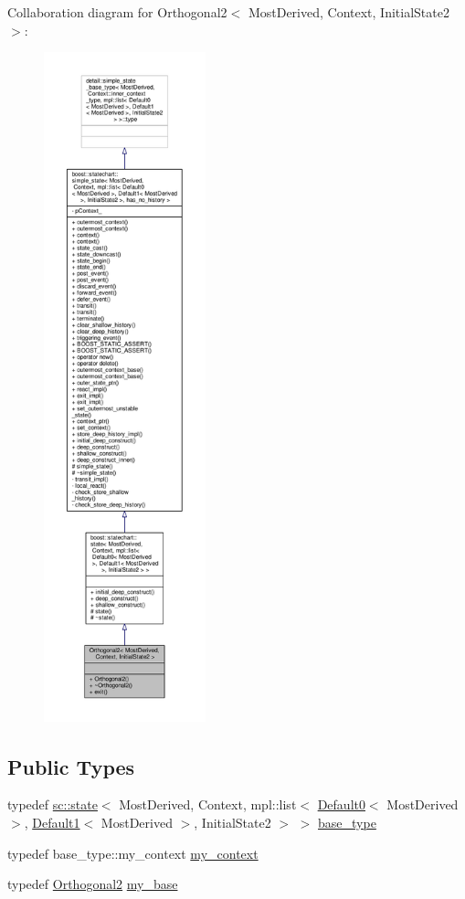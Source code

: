 Collaboration diagram for Orthogonal2$<$ Most\+Derived, Context, Initial\+State2 $>$\+:
\nopagebreak
\begin{figure}[H]
\begin{center}
\leavevmode
\includegraphics[height=550pt]{struct_orthogonal2__coll__graph}
\end{center}
\end{figure}
\subsection*{Public Types}
\begin{DoxyCompactItemize}
\item 
typedef \mbox{\hyperlink{classboost_1_1statechart_1_1state}{sc\+::state}}$<$ Most\+Derived, Context, mpl\+::list$<$ \mbox{\hyperlink{struct_default0}{Default0}}$<$ Most\+Derived $>$, \mbox{\hyperlink{struct_default1}{Default1}}$<$ Most\+Derived $>$, Initial\+State2 $>$ $>$ \mbox{\hyperlink{struct_orthogonal2_ae34a8b5ceae188cb0020b4f396f9fee0}{base\+\_\+type}}
\item 
typedef base\+\_\+type\+::my\+\_\+context \mbox{\hyperlink{struct_orthogonal2_a7ba3bc806df60eb29290185043ac202e}{my\+\_\+context}}
\item 
typedef \mbox{\hyperlink{struct_orthogonal2}{Orthogonal2}} \mbox{\hyperlink{struct_orthogonal2_a358118e3ce2f0ecb8725f77bcfcc4591}{my\+\_\+base}}
\end{DoxyCompactItemize}

